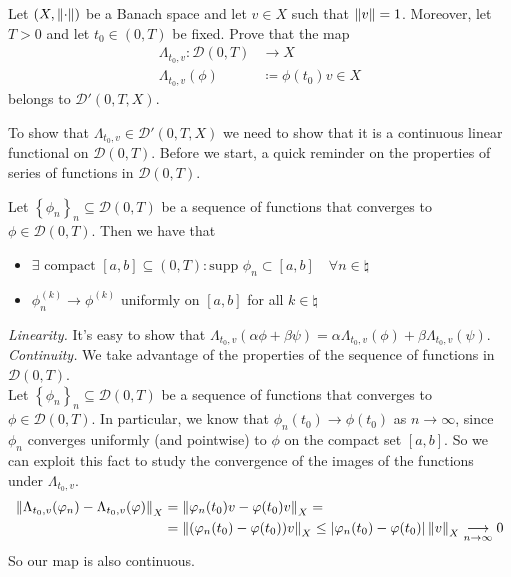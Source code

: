 \newpage
\begin{exercise}
    Let \((X, \norm{\cdot})\) be a Banach space and let \(v \in X\) such that \(\norm{v} = 1\). Moreover, let \(T > 0\) and let \(t_0 \in (0, T)\) be fixed. Prove that the map
    \begin{align*}
        \Lambda_{t_0, v} \colon \mathcal{D}(0, T) & \to X                       \\
        \Lambda_{t_0, v}(\phi)                    & \coloneqq \phi(t_0) v \in X
    \end{align*}
    belongs to \(\mathcal{D}'(0, T, X)\).
\end{exercise}
To show that \(\Lambda_{t_0, v} \in \mathcal{D}'(0, T, X)\) we need to show that it is a continuous linear functional on \(\mathcal{D}(0, T)\).
Before we start, a quick reminder on the properties of series of functions in \(\mathcal{D}(0, T)\).
\begin{remark}
    Let \(\left\{ \phi_n \right\}_{n} \subseteq \mathcal{D}(0, T)\) be a sequence of functions that converges to \(\phi \in \mathcal{D}(0, T)\). Then we have that
    \begin{itemize}
        \item \(\exists \text{ compact }[a, b] \subseteq (0, T) \colon \text{supp } \phi_n \subset [a, b] \quad \forall n \in \natural\)
        \item \(\phi_n^{(k)} \to \phi^{(k)}\) uniformly on \([a, b]\) for all \(k \in \natural\)
    \end{itemize}
\end{remark}
\textit{Linearity.} It's easy to show that \(\Lambda_{t_0, v}(\alpha \phi + \beta \psi) = \alpha \Lambda_{t_0, v}(\phi) + \beta \Lambda_{t_0, v}(\psi)\).\\
\textit{Continuity.}
We take advantage of the properties of the sequence of functions in \(\mathcal{D}(0, T)\). \\
Let \(\left\{ \phi_n \right\}_{n} \subseteq \mathcal{D}(0, T)\) be a sequence of functions
that converges to \(\phi \in \mathcal{D}(0, T)\). In particular, we know that \(\phi_n(t_0) \to \phi(t_0)\) as \(n \to \infty\), since \(\phi_n\) converges uniformly (and pointwise) to \(\phi\) on the compact set \([a, b]\).
So we can exploit this fact to study the convergence of the images of the functions under \(\Lambda_{t_0, v}\).
\[
    \begin{split}
        \norm{\Lambda_{t_0, v}(\varphi_n) - \Lambda_{t_0, v}(\varphi)}_X & = \norm{\varphi_n(t_0) v - \varphi(t_0) v}_X =                                                                                           \\
                                                                   & = \norm{(\varphi_n(t_0) - \varphi(t_0)) v}_X \leq \abs{\varphi_n(t_0) - \varphi(t_0)} \, \norm{v}_X \underset{n \to \infty}{\longrightarrow} 0
    \end{split}
\]
So our map is also continuous.


